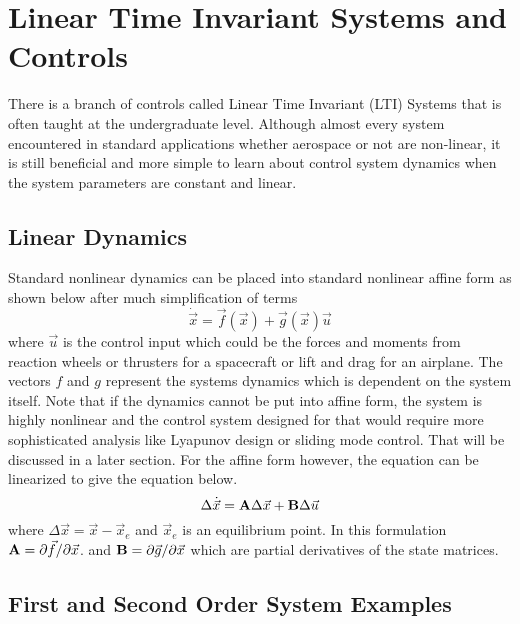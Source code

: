 \section{Linear Time Invariant Systems and Controls}

There is a branch of controls called Linear Time Invariant (LTI)
Systems that is often taught at the undergraduate level. Although
almost every system encountered in standard applications whether
aerospace or not are non-linear, it is still beneficial and more
simple to learn about control system dynamics when the system
parameters are constant and linear. 

\subsection{Linear Dynamics}

Standard nonlinear dynamics can be placed into standard
nonlinear affine form as shown below after much simplification of
terms
\begin{equation}
  \dot{\vec{x}} = \vec{f}(\vec{x}) + \vec{g}(\vec{x})\vec{u}
\end{equation}
where $\vec{u}$ is the control input which could be the forces and
moments from reaction wheels or thrusters for a spacecraft or lift and drag for an airplane. The vectors $f$ and $g$ represent the systems dynamics which is dependent on the system itself. Note that if the dynamics cannot be put into affine form, the system is highly nonlinear and the control system designed for that would require more sophisticated analysis like Lyapunov design or sliding mode control. That will be discussed in a later section. For the affine form however, the equation can be
linearized to give the equation below. 
\begin{equation}
  \Delta \dot{\vec{x}} = {\bf A}\Delta {\vec{x}} + {\bf B}\Delta \vec{u}
\end{equation}
where $\Delta \vec{x} = \vec{x} - \vec{x}_e$ and $\vec{x}_e$ is an
equilibrium point. In this formulation ${\bf A} = \partial \vec{f}/\partial \vec{x}$. and 
${\bf B} = \partial \vec{g}/\partial \vec{x}$ which are partial derivatives of the state matrices.

\subsection{First and Second Order System Examples}

